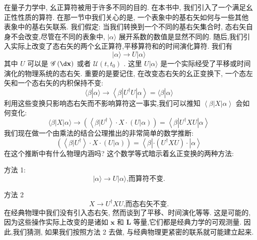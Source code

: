 \documentclass[lang=cn,newtx,10pt,scheme=chinese,thmcnt=section]{elegantbook}
\begin{document}
在量子力学中, 幺正算符被用于许多不同的目的. 在本书中, 我们引入了一个满足幺正性性质的算符. 在那一节中我们关心的是, 一个表象中的基右矢如何与一些其他表象中的基右矢联系. 我们假定: 当我们转换到一个不同的基右矢集合时, 态右矢自身不会改变,尽管在不同的表象中, $|\alpha \rangle$ 展开系数的数值是显然不同的. 随后,我们引入实际上改变了态右矢的两个幺正算符,平移算符和的时间演化算符. 我们有
\begin{equation}
	\left| {\alpha \rangle \rightarrow U}\right| \alpha \rangle
\end{equation}
其中 $U$ 可以是 $\mathscr{G}\left( {\d\mathbf{x}}\right)$ 或者 $\mathcal{U}\left( {t,{t}_{0}}\right)$ . 这里 $U | \alpha \rangle$ 是一个实际经受了平移或时间演化的物理系统的态右矢.
重要的是要记住, 在改变态右矢的幺正变换下, 一个态左矢和一个态右矢的内积保持不变:
\begin{equation}
	\langle \beta | \alpha \rangle \rightarrow \left\langle {\beta \left| {{U}^{ \dagger }U}\right| \alpha }\right\rangle = \langle \beta | \alpha \rangle
\end{equation}
利用这些变换只影响态右矢而不影响算符这一事实,我们可以推知 $\left\langle {\beta \left| X\right| \alpha }\right\rangle$ 会如何变化:
\begin{equation}
	\langle \beta \left| X\right| \alpha \rangle \rightarrow \left( {\left\langle {\beta | {U}^{ \dagger }}\right\rangle \cdot X \cdot \left( {U | \alpha }\right) }\right) = \left\langle {\beta \left| {{U}^{ \dagger }{XU}}\right| \alpha }\right\rangle
\end{equation}
我们现在做一个由乘法的结合公理推出的非常简单的数学推断:
\begin{equation}
	\left( {\left\langle {\beta | {U}^{ \dagger }}\right\rangle \cdot X \cdot \left( {U | \alpha }\right) }\right) = \left\langle {\beta \left| {\cdot \left( {{U}^{ \dagger }{XU}}\right) \cdot }\right| \alpha }\right\rangle
\end{equation}
在这个推断中有什么物理内涵吗? 这个数学等式暗示着幺正变换的两种方法:

方法 1:
\begin{equation}
	\left| {\alpha \rangle \rightarrow U}\right| \alpha \rangle \text{,而算符不变.}
\end{equation}

方法 2
\begin{equation}
	X \rightarrow {U}^{ \dagger }{XU}\text{,而态右矢不变.}
\end{equation}
在经典物理中我们没有引入态右矢, 然而谈到了平移、时间演化等等. 这是可能的, 因为这些操作实际上改变的是诸如 $\mathbf{x}$ 和 $\mathbf{L}$ 等量,它们都是经典力学的可观测量. 因此,我们猜测, 如果我们按照方法 2 去做, 与经典物理更紧密的联系就可能建立起来.
\end{document}
